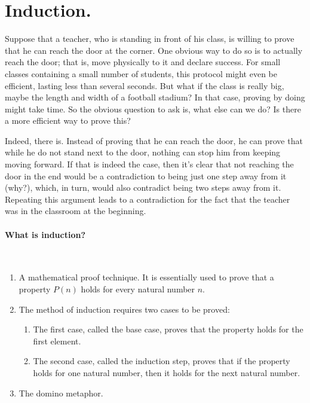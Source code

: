 
\section{Induction.}
\ifdefined\RECITATION
\else
Suppose that a teacher, who is standing in front of his class, is willing to prove that he can reach the door at the corner. One obvious way to do so is to actually reach the door; that is, move physically to it and declare success. For small classes containing a small number of students, this protocol might even be efficient, lasting less than several seconds. But what if the class is really big, maybe the length and width of a football stadium? In that case, proving by doing might take time. So the obvious question to ask is, what else can we do? Is there a more efficient way to prove this?

Indeed, there is. Instead of proving that he can reach the door, he can prove that while he do not stand next to the door, nothing can stop him from keeping moving forward. If that is indeed the case, then it's clear that not reaching the door in the end would be a contradiction to being just one step away from it (why?), which, in turn, would also contradict being two steps away from it. Repeating this argument leads to a contradiction for the fact that the teacher was in the classroom at the beginning.
\fi
\paragraph{What is induction?}~\begin{enumerate}
    \item A mathematical proof technique. It is essentially used to prove that a property \(P(n)\) holds for every natural number \(n\).
    \item The method of induction requires two cases to be proved:
    \begin{enumerate}
        \item The first case, called the base case, proves that the property holds for the first element.
        \item The second case, called the induction step, proves that if the property holds for one natural number, then it holds for the next natural number.
    \end{enumerate}
    \item The domino metaphor. 
\end{enumerate}
